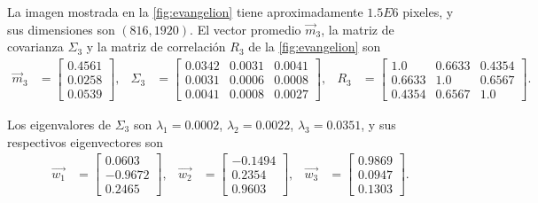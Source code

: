 La imagen mostrada en la \cref{fig:evangelion} tiene aproximadamente $1.5E6$ pixeles, y sus dimensiones son $(816, 1920)$. El vector promedio $\vec{m}_3$, la matriz de covarianza $\Sigma_3$ y la matriz de correlación $R_3$ de la \cref{fig:evangelion} son
\begin{align*}
    \vec{m}_3 & =
    \begin{bmatrix}
        0.4561 \\
        0.0258 \\
        0.0539
    \end{bmatrix}, &
    \Sigma_3 & =
    \begin{bmatrix}
        0.0342 & 0.0031 & 0.0041 \\
        0.0031 & 0.0006 & 0.0008 \\
        0.0041 & 0.0008 & 0.0027
    \end{bmatrix}, &
    R_3 & = 
    \begin{bmatrix}
        1.0    & 0.6633 & 0.4354 \\
        0.6633 & 1.0    & 0.6567 \\
        0.4354 & 0.6567 & 1.0
    \end{bmatrix}.
\end{align*}

Los eigenvalores de $\Sigma_3$ son $\lambda_1 = 0.0002$, $\lambda_2 = 0.0022$, $\lambda_3 = 0.0351$, y sus respectivos eigenvectores son
\begin{align*}
    \vec{w_1} & =
    \begin{bmatrix}
        0.0603 \\
        -0.9672 \\
        0.2465
    \end{bmatrix}, &
    \vec{w_2} & = 
    \begin{bmatrix}
        -0.1494 \\
        0.2354 \\
        0.9603
    \end{bmatrix}, &
    \vec{w_3} & =
    \begin{bmatrix}
        0.9869 \\
        0.0947 \\
        0.1303
    \end{bmatrix}.
\end{align*}

